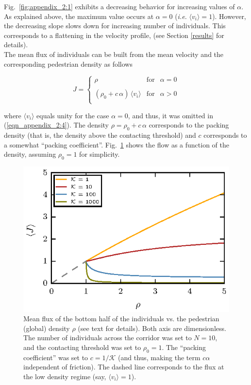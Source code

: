 Fig.~\ref{fig:appendix_2:1} exhibits a decreasing behavior for increasing 
values of $\alpha$. As explained above, the maximum value occurs at $\alpha=0$ 
(\textit{i.e.} $\langle v_i\rangle=1$). However, the decreasing slope slows 
down for increasing number of individuals. This corresponds to a flattening in 
the velocity profile, (see Section \ref{results} for details).  \\

The mean flux of individuals can be built from the mean velocity and the 
corresponding pedestrian density as follows

\begin{equation}
 J=\left\{\begin{array}{lcl}
          \rho & \mathrm{for} & \alpha=0 \\
          & & \\
          (\rho_0+c\,\alpha)\,\langle v_i\rangle & \mathrm{for}  & 
\alpha>0\\
         \end{array}\right.\label{eqn_appendix_2:4}
\end{equation}

where $\langle v_i\rangle$ equals unity for the case $\alpha=0$, and thus, it 
was omitted in (\ref{eqn_appendix_2:4}). The density $\rho=\rho_0+c\,\alpha$ 
corresponds to the packing density (that is, the density above the contacting 
threshold) and $c$ corresponds to a somewhat ``packing coefficient''. 
Fig.~\ref{fig:appendix_2:2} shows the flow as a function of the density, 
assuming $\rho_0=1$ for simplicity. \\


\begin{figure}[htbp!]
\includegraphics[width=\columnwidth]
{./plots/fig_flux_model.eps}
\caption{\label{fig:appendix_2:2} Mean flux of the bottom half of the 
individuals vs. the pedestrian (global) density $\rho$ (see text for details). 
Both axis are dimensionless. The number of individuals across the 
corridor was set to $N=10$, and the contacting threshold was set to $\rho_0=1$. 
The ``packing coefficient'' was set to $c=1/\mathcal{K}$ (and thus, making the 
term $c\alpha$ independent of friction). The dashed line corresponds to the 
flux at the low density regime (say, $\langle v_i\rangle=1$).   }
\end{figure}



